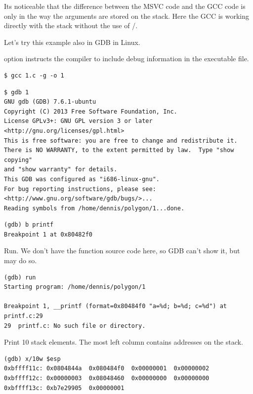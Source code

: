 Its noticeable that the difference between the MSVC code and the GCC code is only in the way the arguments are stored on the stack.
Here the GCC is working directly with the stack without the use of \PUSH/\POP.


Let's try this example also in \ac{GDB} in Linux.

 option instructs the compiler to include debug information in the executable file.

\begin{lstlisting}
$ gcc 1.c -g -o 1
\end{lstlisting}

\begin{lstlisting}
$ gdb 1
GNU gdb (GDB) 7.6.1-ubuntu
Copyright (C) 2013 Free Software Foundation, Inc.
License GPLv3+: GNU GPL version 3 or later <http://gnu.org/licenses/gpl.html>
This is free software: you are free to change and redistribute it.
There is NO WARRANTY, to the extent permitted by law.  Type "show copying"
and "show warranty" for details.
This GDB was configured as "i686-linux-gnu".
For bug reporting instructions, please see:
<http://www.gnu.org/software/gdb/bugs/>...
Reading symbols from /home/dennis/polygon/1...done.
\end{lstlisting}

\begin{lstlisting}[caption=let's set breakpoint on \printf]
(gdb) b printf
Breakpoint 1 at 0x80482f0
\end{lstlisting}

Run.
We don't have the \printf function source code here, so \ac{GDB} can't show it, but may do so.

\begin{lstlisting}
(gdb) run
Starting program: /home/dennis/polygon/1 

Breakpoint 1, __printf (format=0x80484f0 "a=%d; b=%d; c=%d") at printf.c:29
29	printf.c: No such file or directory.
\end{lstlisting}

Print 10 stack elements. The most left column contains addresses on the stack.

\begin{lstlisting}
(gdb) x/10w $esp
0xbffff11c:	0x0804844a	0x080484f0	0x00000001	0x00000002
0xbffff12c:	0x00000003	0x08048460	0x00000000	0x00000000
0xbffff13c:	0xb7e29905	0x00000001
\end{lstlisting}


